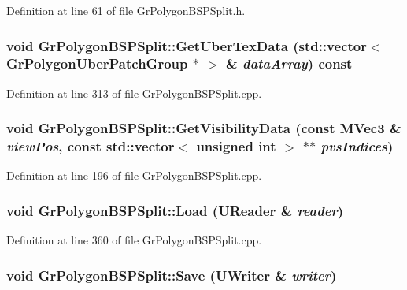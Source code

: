 Definition at line 61 of file GrPolygonBSPSplit.h.\hypertarget{class_gr_polygon_b_s_p_split_3644235a26f02d01f26b7c7d36b0f60a}{
\subsubsection[{GetUberTexData}]{\setlength{\rightskip}{0pt plus 5cm}void GrPolygonBSPSplit::GetUberTexData (std::vector$<$ {\bf GrPolygonUberPatchGroup} $\ast$ $>$ \& {\em dataArray}) const}}
\label{class_gr_polygon_b_s_p_split_3644235a26f02d01f26b7c7d36b0f60a}




Definition at line 313 of file GrPolygonBSPSplit.cpp.\hypertarget{class_gr_polygon_b_s_p_split_39017ae93b1f5f803a48e40f16ab5458}{
\subsubsection[{GetVisibilityData}]{\setlength{\rightskip}{0pt plus 5cm}void GrPolygonBSPSplit::GetVisibilityData (const {\bf MVec3} \& {\em viewPos}, \/  const std::vector$<$ unsigned int $>$ $\ast$$\ast$ {\em pvsIndices})}}
\label{class_gr_polygon_b_s_p_split_39017ae93b1f5f803a48e40f16ab5458}




Definition at line 196 of file GrPolygonBSPSplit.cpp.\hypertarget{class_gr_polygon_b_s_p_split_35f582798698836db4462972f55fb8a9}{
\subsubsection[{Load}]{\setlength{\rightskip}{0pt plus 5cm}void GrPolygonBSPSplit::Load ({\bf UReader} \& {\em reader})}}
\label{class_gr_polygon_b_s_p_split_35f582798698836db4462972f55fb8a9}




Definition at line 360 of file GrPolygonBSPSplit.cpp.\hypertarget{class_gr_polygon_b_s_p_split_3e022c2366958ba8f17e642893f73603}{
\subsubsection[{Save}]{\setlength{\rightskip}{0pt plus 5cm}void GrPolygonBSPSplit::Save ({\bf UWriter} \& {\em writer})}}
\label{class_gr_polygon_b_s_p_split_3e022c2366958ba8f17e642893f73603}




